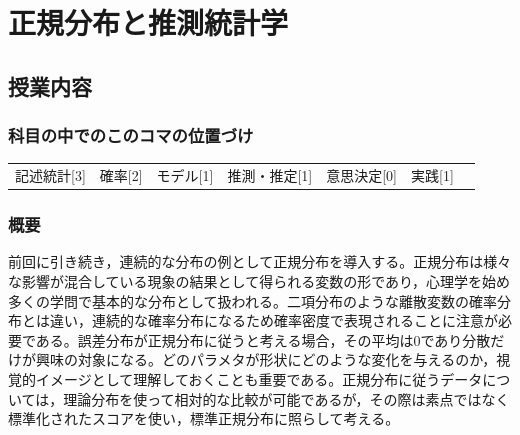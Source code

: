 \section{正規分布と推測統計学}
\label{lesson07}

\subsection{授業内容}
\subsubsection{科目の中でのこのコマの位置づけ}
\begin{tabular}[t]{ccccccc}
    記述統計[3] & 確率[2] & モデル[1] & 推測・推定[1] & 意思決定[0] & 実践[1]
\end{tabular}

\subsubsection{概要}
前回に引き続き，連続的な分布の例として正規分布を導入する。正規分布は様々な影響が混合している現象の結果として得られる変数の形であり，心理学を始め多くの学問で基本的な分布として扱われる。二項分布のような離散変数の確率分布とは違い，連続的な確率分布になるため確率密度で表現されることに注意が必要である。誤差分布が正規分布に従うと考える場合，その平均は0であり分散だけが興味の対象になる。どのパラメタが形状にどのような変化を与えるのか，視覚的イメージとして理解しておくことも重要である。正規分布に従うデータについては，理論分布を使って相対的な比較が可能であるが，その際は素点ではなく標準化されたスコアを使い，標準正規分布に照らして考える。
